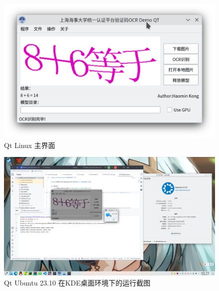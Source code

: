 \begin{figure}
	\centering
	\includegraphics[width=0.9\linewidth]{Resources/Picture/Deploy/Qt/Linux/qt_linux_main}
	\caption{Qt Linux 主界面}
	\label{fig:qtlinuxmain}
\end{figure}

\begin{figure}
	\centering
	\includegraphics[width=0.9\linewidth]{Resources/Picture/Deploy/Qt/Linux/linux}
	\caption{Qt Ubuntu 23.10 在KDE桌面环境下的运行截图}
	\label{fig:linux}
\end{figure}

